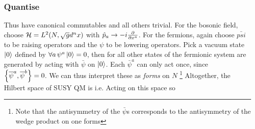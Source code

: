 \documentclass{article}
\begin{document}
\subsubsection*{Quantise}
Thus have canonical commutables 
and all others trivial. For the bosonic field, choose $\mc{H} = L^2(N, \sqrt{g}d^n x )$ with $\hat{p}_a \to -i \pd{x^a}$. For the fermions, again choose $\bar{psi}$ to be raising operators and the $\psi$ to be lowering operators. Pick a vacuum state $\ket{0}$ defined by $\forall a \, \psi^a \ket{0}=0$, then for all other states of the fermionic system are generated by acting with $\bar{\psi}$ on $\ket{0}$. Each $\bar{\psi}^a$ can only act once, since $\acomm[\bar{\psi}^a]{\bar{\psi}^b}=0$. We can thus interpret these as \emph{forms} on $N$ 
\footnote{Note that the antisymmetry of the $\bar{\psi}$s corresponds to the antisymmetry of the wedge product on one forms}
Altogether, the Hilbert space of SUSY QM is 
i.e. 
Acting on this space 
so 
\end{document}
